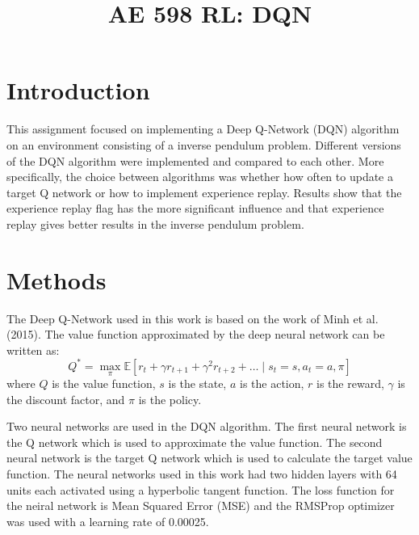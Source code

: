 \documentclass[conference]{IEEEtran}
\begin{document}
\title{AE 598 RL: DQN}

\author{
}

\maketitle

\section{Introduction}
This assignment focused on implementing a Deep Q-Network (DQN) algorithm on an environment consisting of a inverse pendulum problem. Different versions of the DQN algorithm were implemented and compared to each other. More specifically, the choice between algorithms was whether how often to update a target Q network or how to implement experience replay. Results show that the experience replay flag has the more significant influence and that experience replay gives better results in the inverse pendulum problem.

\section{Methods}
The Deep Q-Network used in this work is based on the work of Minh et al. (2015)\cite{b1}. The value function approximated by the deep neural network can be written as:
\begin{equation}
    Q^*=\max _\pi \mathbb{E}\left[r_t+\gamma r_{t+1}+\gamma^2 r_{t+2}+\ldots \mid s_t=s, a_t=a, \pi\right]
\end{equation}
where $Q$ is the value function, $s$ is the state, $a$ is the action, $r$ is the reward, $\gamma$ is the discount factor, and $\pi$ is the policy.

Two neural networks are used in the DQN algorithm. The first neural network is the Q network which is used to approximate the value function. The second neural network is the target Q network which is used to calculate the target value function. The neural networks used in this work had two hidden layers with 64 units each activated using a hyperbolic tangent function. The loss function for the neiral network is Mean Squared Error (MSE) and the RMSProp optimizer was used with a learning rate of 0.00025.
\end{document}

